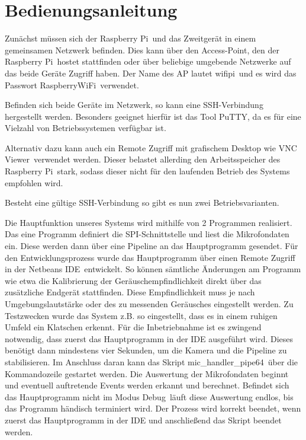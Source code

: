 \section{Bedienungsanleitung}

Zunächst müssen sich der \glqq Raspberry Pi\grqq\ und das Zweitgerät in einem gemeinsamen Netzwerk befinden. Dies kann über den Access-Point, den der \glqq Raspberry Pi\grqq\ hostet stattfinden oder über beliebige umgebende Netzwerke auf das beide Geräte Zugriff haben. Der Name des AP lautet \glqq wifipi\grqq\ und es wird das Passwort \glqq RaspberryWiFi\grqq\ verwendet.

Befinden sich beide Geräte im Netzwerk, so kann eine SSH-Verbindung hergestellt werden. Besonders geeignet hierfür ist das Tool \glqq PuTTY\grqq, da es für eine Vielzahl von Betriebssystemen verfügbar ist. 

Alternativ dazu kann auch ein Remote Zugriff mit grafischem Desktop wie \glqq VNC Viewer\grqq\ verwendet werden. Dieser belastet allerding den Arbeitsspeicher des \glqq Raspberry Pi\grqq\  stark, sodass dieser nicht für den laufenden Betrieb des Systems empfohlen wird. 

Besteht eine gültige SSH-Verbindung so gibt es nun zwei Betriebsvarianten. 

Die Hauptfunktion unseres Systems wird mithilfe von 2 Programmen realisiert. Das eine Programm definiert die SPI-Schnittstelle und liest die Mikrofondaten ein. Diese werden dann über eine Pipeline an das Hauptprogramm gesendet. Für den Entwicklungsprozess wurde das Hauptprogramm über einen Remote Zugriff in der \glqq Netbeans IDE\grqq\ entwickelt. So können sämtliche Änderungen am Programm wie etwa die Kalibrierung der Geräuschempfindlichkeit direkt über das zusätzliche Endgerät stattfinden. Diese Empfindlichkeit muss je nach Umgebungslautstärke oder des zu messenden Geräusches eingestellt werden. Zu Testzwecken wurde das System z.B. so eingestellt, dass es in einem ruhigen Umfeld ein Klatschen erkennt. Für die Inbetriebnahme ist es zwingend notwendig, dass zuerst das Hauptprogramm in der IDE ausgeführt wird. Dieses benötigt dann mindestens vier Sekunden, um die Kamera und die Pipeline zu stabilisieren. Im Anschluss daran kann das Skript \glqq mic\_handler\_pipe64\grqq\ über die Kommandozeile gestartet werden. Die Auswertung der Mikrofondaten beginnt und eventuell auftretende Events werden erkannt und berechnet. Befindet sich das Hauptprogramm nicht im Modus \glqq Debug\grqq\ läuft diese Auswertung endlos, bis das Programm händisch terminiert wird. Der Prozess wird korrekt beendet, wenn zuerst das Hauptprogramm in der IDE und anschließend das Skript beendet werden.

